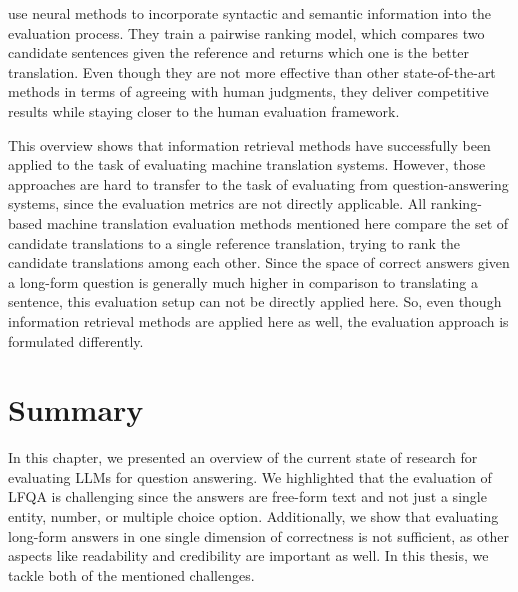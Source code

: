 \cite{guzman:2019:Pairwise} use neural methods to incorporate syntactic and semantic information into the evaluation process.
They train a pairwise ranking model, which compares two candidate sentences given the reference and returns which one is the better translation.
Even though they are not more effective than other state-of-the-art methods in terms of agreeing with human judgments, they deliver competitive results while staying closer to the human evaluation framework.


This overview shows that information retrieval methods have successfully been applied to the task of evaluating machine translation systems.
However, those approaches are hard to transfer to the task of evaluating from question-answering systems, since the evaluation metrics are not directly applicable.
All ranking-based machine translation evaluation methods mentioned here compare the set of candidate translations to a single reference translation, trying to rank the candidate translations among each other.
Since the space of correct answers given a long-form question is generally much higher in comparison to translating a sentence, this evaluation setup can not be directly applied here.
So, even though information retrieval methods are applied here as well, the evaluation approach is formulated differently.

\section{Summary}
In this chapter, we presented an overview of the current state of research for evaluating LLMs for question answering.
We highlighted that the evaluation of LFQA is challenging since the answers are free-form text and not just a single entity, number, or multiple choice option.
Additionally, we show that evaluating long-form answers in one single dimension of correctness is not sufficient, as other aspects like readability and credibility are important as well.
In this thesis, we tackle both of the mentioned challenges.

